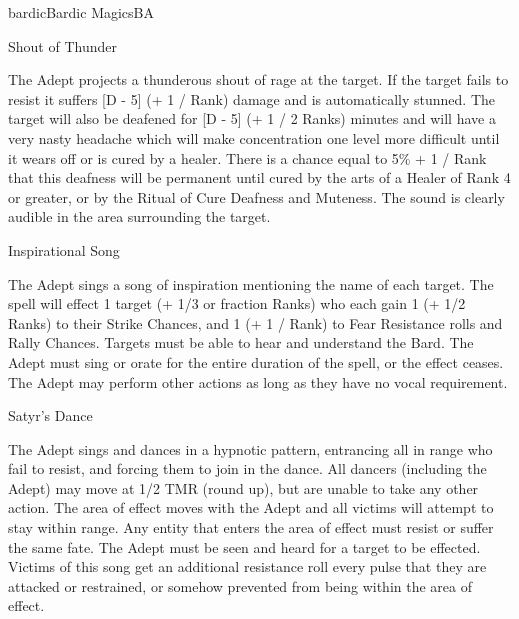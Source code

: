 \begin{college}[2.1]{bardic}{Bardic Magics}{BA}
\begin{spell}[S-7]{Shout of Thunder}
\begin{effects}
The Adept projects a thunderous shout of rage at the target. If the
target fails to resist it suffers [D - 5] (+ 1 / Rank) damage and is
automatically stunned. The target will also be deafened for [D - 5] (+
1 / 2 Ranks) minutes and will have a very nasty headache which will
make concentration one level more difficult until it wears off or is
cured by a healer. There is a chance equal to 5\% + 1 / Rank that this
deafness will be permanent until cured by the arts of a Healer of Rank
4 or greater, or by the Ritual of Cure Deafness and Muteness. The
sound is clearly audible in the area surrounding the target.
\end{effects}
\end{spell}

\begin{spell}[S-8]{Inspirational Song}

\begin{effects}
The Adept sings a song of inspiration mentioning the name of each
target. The spell will effect 1 target (+ 1/3 or fraction Ranks) who
each gain 1 (+ 1/2 Ranks) to their Strike Chances, and 1 (+ 1 / Rank)
to Fear Resistance rolls and Rally Chances. Targets must be able to
hear and understand the Bard. The Adept must sing or orate for the
entire duration of the spell, or the effect ceases. The Adept may
perform other actions as long as they have no vocal requirement.
\end{effects}
\end{spell}

\begin{spell}[S-9]{Satyr's Dance}

\begin{effects}
The Adept sings and dances in a hypnotic pattern, entrancing all in
range who fail to resist, and forcing them to join in the dance. All
dancers (including the Adept) may move at 1/2 TMR (round up), but are
unable to take any other action. The area of effect moves with the
Adept and all victims will attempt to stay within range. Any entity
that enters the area of effect must resist or suffer the same fate.
The Adept must be seen and heard for a target to be effected.  Victims
of this song get an additional resistance roll every pulse that they
are attacked or restrained, or somehow prevented from being within the
area of effect.
\end{effects}
\end{spell}


\end{college}
